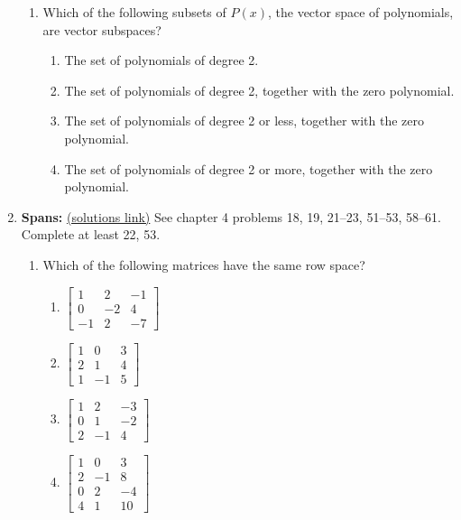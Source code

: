 \begin{enumerate}
\begin{enumerate}
	\item Which of the following subsets of $P(x)$, the vector space of polynomials, are vector subspaces?
		\begin{enumerate}
			\item The set of polynomials of degree 2.
			\item The set of polynomials of degree 2, together with the zero polynomial.
			\item The set of polynomials of degree 2 or less, together with the zero polynomial.
			\item The set of polynomials of degree 2 or more, together with the zero polynomial.
		\end{enumerate}

\end{enumerate}


\item \textbf{Spans:} \label{span problems} \hypertarget{span problems target}{\hyperlink{span solutions target}{(solutions link)}}
See chapter 4 problems 18, 19, 21--23, 51--53, 58--61. 
Complete at least 22, 53.

\begin{enumerate}
	\item Which of the following matrices have the same row space?
\begin{multicols}{4}
\begin{enumerate}
\item 
$\begin{bmatrix}
 1 & 2 & -1 \\
 0 & -2 & 4 \\
 -1 & 2 & -7
\end{bmatrix}$

\item 
$\begin{bmatrix}
 1 & 0 & 3 \\
 2 & 1 & 4 \\
 1 & -1 & 5
\end{bmatrix}$

\item 
$\begin{bmatrix}
 1 & 2 & -3 \\
 0 & 1 & -2 \\
 2 & -1 & 4
\end{bmatrix}$

\item 
$\begin{bmatrix}
 1 & 0 & 3 \\
 2 & -1 & 8 \\
 0 & 2 & -4 \\
 4 & 1 & 10
\end{bmatrix}$


\end{enumerate}
\end{multicols}
\end{enumerate}
\end{enumerate}
